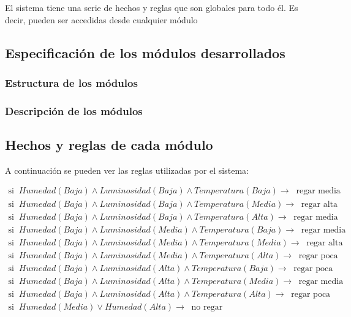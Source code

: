 \documentclass[11pt,a4paper]{article}
\begin{document}
El sistema tiene una serie de hechos y reglas que son globales para todo él. Es decir, pueden ser accedidas desde cualquier
módulo

\subsection{Especificación de los módulos desarrollados}

\subsubsection{Estructura de los módulos}

\subsubsection{Descripción de los módulos}

\subsection{Hechos y reglas de cada módulo}

A continuación se
pueden ver las reglas utilizadas por el sistema:

\begin{gather*}
	\text{si} \; \; Humedad(Baja) \land Luminosidad(Baja) \land Temperatura(Baja) \rightarrow \; \; \text{regar media} \\
	\text{si} \; \; Humedad(Baja) \land Luminosidad(Baja) \land Temperatura(Media) \rightarrow \; \; \text{regar alta} \\
	\text{si} \; \; Humedad(Baja) \land Luminosidad(Baja) \land Temperatura(Alta) \rightarrow \; \; \text{regar media} \\
	\text{si} \; \; Humedad(Baja) \land Luminosidad(Media) \land Temperatura(Baja) \rightarrow \; \; \text{regar media} \\
	\text{si} \; \; Humedad(Baja) \land Luminosidad(Media) \land Temperatura(Media) \rightarrow \; \; \text{regar alta} \\
	\text{si} \; \; Humedad(Baja) \land Luminosidad(Media) \land Temperatura(Alta) \rightarrow \; \; \text{regar poca} \\
	\text{si} \; \; Humedad(Baja) \land Luminosidad(Alta) \land Temperatura(Baja) \rightarrow \; \; \text{regar poca} \\
	\text{si} \; \; Humedad(Baja) \land Luminosidad(Alta) \land Temperatura(Media) \rightarrow \; \; \text{regar media} \\
	\text{si} \; \; Humedad(Baja) \land Luminosidad(Alta) \land Temperatura(Alta) \rightarrow \; \; \text{regar poca} \\
	\text{si} \; \; Humedad(Media) \lor Humedad(Alta) \rightarrow \; \; \text{no regar}
\end{gather*}
\end{document}
